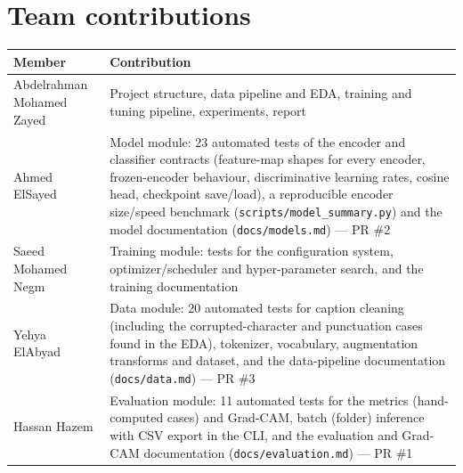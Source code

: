 \documentclass[11pt,a4paper]{article}
\begin{document}
\section{Team contributions}
\begin{table}[H]\centering\small
\begin{tabular}{p{4.2cm}p{11cm}}
\toprule
Member & Contribution\\
\midrule
Abdelrahman Mohamed Zayed & Project structure, data pipeline and EDA, training and tuning pipeline, experiments, report\\
Ahmed ElSayed & Model module: 23 automated tests of the encoder and classifier contracts (feature-map shapes for every encoder, frozen-encoder behaviour, discriminative learning rates, cosine head, checkpoint save/load), a reproducible encoder size/speed benchmark (\texttt{scripts/model\_summary.py}) and the model documentation (\texttt{docs/models.md}) --- PR \#2\\
Saeed Mohamed Negm & Training module: tests for the configuration system, optimizer/scheduler and hyper-parameter search, and the training documentation\\
Yehya ElAbyad & Data module: 20 automated tests for caption cleaning (including the corrupted-character and punctuation cases found in the EDA), tokenizer, vocabulary, augmentation transforms and dataset, and the data-pipeline documentation (\texttt{docs/data.md}) --- PR \#3\\
Hassan Hazem & Evaluation module: 11 automated tests for the metrics (hand-computed cases) and Grad-CAM, batch (folder) inference with CSV export in the CLI, and the evaluation and Grad-CAM documentation (\texttt{docs/evaluation.md}) --- PR \#1\\
\bottomrule
\end{tabular}
\end{table}
\end{document}
